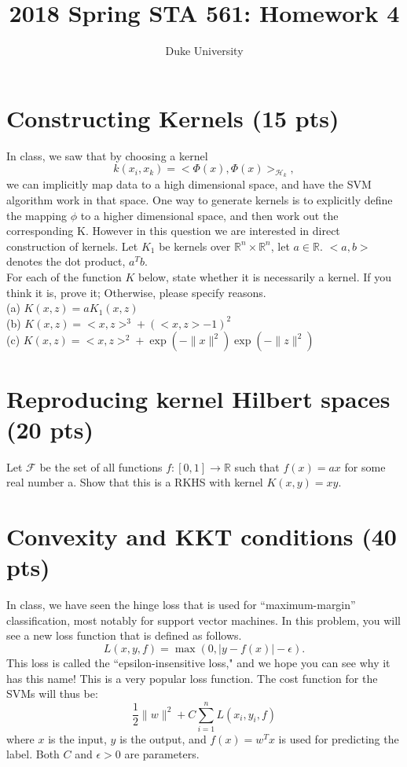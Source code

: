 \documentclass[11pt]{article}
\begin{document}
\title{2018 Spring STA 561: Homework 4}

\author{Duke University}

\maketitle

\section{Constructing Kernels (15 pts)}
In class, we saw that by choosing a kernel $$k(x_i,x_k)=<\Phi(x),\Phi(x)>_{\mathcal{H}_k},$$ we can implicitly map
data to a high dimensional space, and have the SVM algorithm work in that space. One way to generate kernels is to explicitly define the mapping $\phi$ to a higher dimensional space,
and then work out the corresponding K. However in this question we are interested in direct construction of kernels. Let $K_1$ be kernels over $\mathbb{R}^n\times\mathbb{R}^n$, let $a \in \mathbb{R}$. $<a,b>$ denotes the dot product, $a^Tb$.  \\

\noindent For each of the function $K$ below, state whether it is necessarily a kernel. If you think it is, prove it; Otherwise, please specify reasons.\\

\noindent
(a) $K(x,z)=aK_1(x,z)$\\
(b) $K(x,z)=<x,z>^3+(<x,z>-1)^2$\\
(c) $K(x,z)=<x,z>^2+\exp(-\|x\|^2)\exp(-\|z\|^2)$\\


\section{Reproducing kernel Hilbert spaces (20 pts)}

Let $\mathscr{F}$ be the set of all functions $f: [0,1]\rightarrow \mathbb{R}$ such that $f(x)=ax$ for some real number a. Show that this is a RKHS with kernel $K(x,y)=xy$.




\section{Convexity and KKT conditions (40 pts)}
In class, we have seen the hinge loss that is used for ``maximum-margin'' classification, most notably for support vector machines. In this problem, you will see a new loss function that is defined as follows. $$L(x,y,f)=\max(0,|y-f(x)|-\epsilon).$$ This loss is called the ``epsilon-insensitive loss," and we hope you can see why it has this name! This is a very popular loss function. The cost function for the SVMs will thus be: 
$$\frac{1}{2}\|w\|^2+C\sum_{i=1}^{n}L(x_i,y_i,f)$$
where $x$ is the input, $y$ is the output, and $f(x)=w^Tx$ is used for predicting the label. Both $C$ and $\epsilon>0$ are parameters.\\
\end{document}
